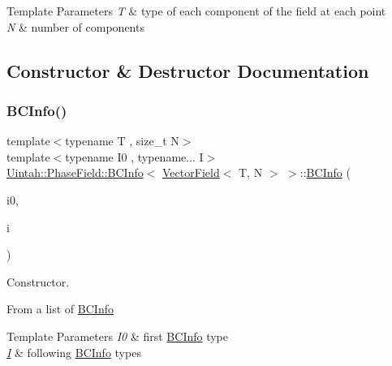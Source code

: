 \begin{DoxyTemplParams}{Template Parameters}
{\em T} & type of each component of the field at each point \\
\hline
{\em N} & number of components \\
\hline
\end{DoxyTemplParams}


\subsection{Constructor \& Destructor Documentation}
\mbox{\label{structUintah_1_1PhaseField_1_1BCInfo_3_01VectorField_3_01T_00_01N_01_4_01_4_a90e4e750e4c44c0a04aeb5ea2f81b565}} 
\subsubsection{\texorpdfstring{B\+C\+Info()}{BCInfo()}}
{\footnotesize\ttfamily template$<$typename T , size\+\_\+t N$>$ \\
template$<$typename I0 , typename... I$>$ \\
\hyperlink{structUintah_1_1PhaseField_1_1BCInfo}{Uintah\+::\+Phase\+Field\+::\+B\+C\+Info}$<$ \hyperlink{structUintah_1_1PhaseField_1_1VectorField}{Vector\+Field}$<$ T, N $>$ $>$\+::\hyperlink{structUintah_1_1PhaseField_1_1BCInfo}{B\+C\+Info} (\begin{DoxyParamCaption}\item[{\hyperlink{namespaceUintah_1_1PhaseField_a547ce3002aa97fbd3ef3192a6eec8406abdd8ebcbdfd71d1125937e3012dc45fb}{I0} \&\&}]{i0,  }\item[{\hyperlink{structUintah_1_1PhaseField_1_1I}{I} \&\&...}]{i }\end{DoxyParamCaption})\hspace{0.3cm}{\ttfamily [inline]}}



Constructor. 

From a list of \hyperlink{structUintah_1_1PhaseField_1_1BCInfo}{B\+C\+Info} 
\begin{DoxyTemplParams}{Template Parameters}
{\em I0} & first \hyperlink{structUintah_1_1PhaseField_1_1BCInfo}{B\+C\+Info} type \\
\hline
{\em \hyperlink{structUintah_1_1PhaseField_1_1I}{I}} & following \hyperlink{structUintah_1_1PhaseField_1_1BCInfo}{B\+C\+Info} types \\
\hline
\end{DoxyTemplParams}

